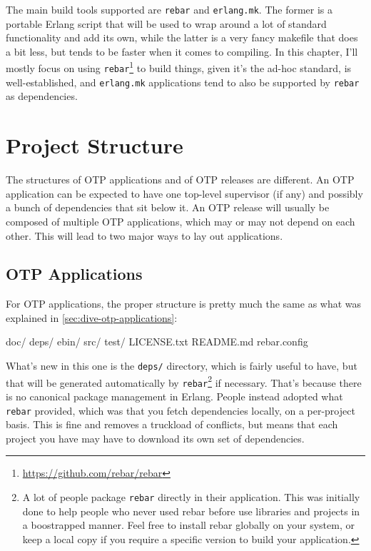 \documentclass[11pt, oneside]{book}   	%
\newcommand{\filename}[1]{\Verb`#1`}
\newcommand{\app}[1]{\Verb`#1`}
\begin{document}
The main build tools supported are \app{rebar} and \app{erlang.mk}. The former is a portable Erlang script that will be used to wrap around a lot of standard functionality and add its own, while the latter is a very fancy makefile that does a bit less, but tends to be faster when it comes to compiling. In this chapter, I'll mostly focus on using \app{rebar}\footnote{\href{https://github.com/rebar/rebar}{https://github.com/rebar/rebar}} to build things, given it's the ad-hoc standard, is well-established, and \app{erlang.mk} applications tend to also be supported by \app{rebar} as dependencies.

\section{Project Structure}
\label{sec:project-structure}

The structures of OTP applications and of OTP releases are different. An OTP application can be expected to have one top-level supervisor (if any) and possibly a bunch of dependencies that sit below it. An OTP release will usually be composed of multiple OTP applications, which may or may not depend on each other. This will lead to two major ways to lay out applications.

\subsection{OTP Applications}
\label{subsec:building-otp-applications}

For OTP applications, the proper structure is pretty much the same as what was explained in \ref{sec:dive-otp-applications}:

\begin{VerbatimText}
doc/
deps/
ebin/
src/
test/
LICENSE.txt
README.md
rebar.config
\end{VerbatimText}

What's new in this one is the \filename{deps/} directory, which is fairly useful to have, but that will be generated automatically by \app{rebar}\footnote{A lot of people package \app{rebar} directly in their application. This was initially done to help people who never used rebar before use libraries and projects in a boostrapped manner. Feel free to install rebar globally on your system, or keep a local copy if you require a specific version to build your application.} if necessary. That's because there is no canonical package management in Erlang. People instead adopted what \app{rebar} provided, which was that you fetch dependencies locally, on a per-project basis. This is fine and removes a truckload of conflicts, but means that each project you have may have to download its own set of dependencies.
\end{document}
